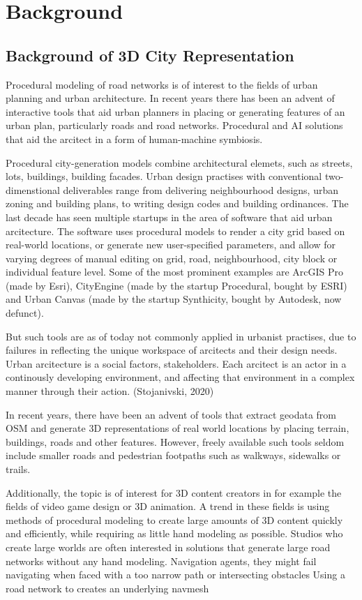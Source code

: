 \documentclass[a4paper]{article}
\begin{document}
\section{Background}

\subsection{Background of 3D City Representation}

Procedural modeling of road networks is of interest to the fields of urban planning and urban architecture. In recent years there has been an advent of interactive tools that aid urban planners in placing or generating features of an urban plan, particularly roads and road networks. Procedural and AI solutions that aid the arcitect in a form of human-machine symbiosis.

Procedural city-generation models combine architectural elemets, such as streets, lots, buildings, building facades.
Urban design practises with conventional two-dimenstional deliverables range from delivering neighbourhood designs, urban zoning and building plans, to writing design codes and building ordinances.
The last decade has seen multiple startups in the area of software that aid urban arcitecture. The software uses procedural models to render a city grid based on real-world locations, or generate new user-specified parameters, and allow for varying degrees of manual editing on grid, road, neighbourhood, city block or individual feature level.
Some of the most prominent examples are ArcGIS Pro (made by Esri), CityEngine (made by the startup Procedural, bought by ESRI) and Urban Canvas (made by the startup Synthicity, bought by Autodesk, now defunct).

But such tools are as of today not commonly applied in urbanist practises, due to failures in reflecting the unique workspace of arcitects and their design needs. Urban arcitecture is a social factors, stakeholders. Each arcitect is an actor in a continously developing environment, and affecting that environment in a complex manner through their action.
(Stojanivski, 2020)

In recent years, there have been an advent of tools that extract geodata from OSM and generate 3D representations of real world locations by placing terrain, buildings, roads and other features.
However, freely available such tools seldom include smaller roads and pedestrian footpaths such as walkways, sidewalks or trails.

Additionally, the topic is of interest for 3D content creators in for example the fields of video game design or 3D animation. A trend in these fields is using methods of procedural modeling to create large amounts of 3D content quickly and efficiently, while requiring as little hand modeling as possible. Studios who create large worlds are often interested in solutions that generate large road networks without any hand modeling.
Navigation agents, they might fail navigating when faced with a too narrow path or intersecting obstacles
Using a road network to creates an underlying navmesh
\end{document}
